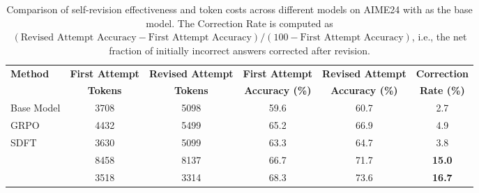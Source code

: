 \begin{table}[H]
\centering
\setlength{\tabcolsep}{3pt}
\small
\begin{tabular}{lccccc}
\toprule
\multirow{2}{*}{\textbf{Method}} & \textbf{First Attempt} & \textbf{Revised Attempt} & \textbf{First Attempt } & \textbf{Revised Attempt} & \textbf{Correction} \\
 & \textbf{Tokens} & \textbf{Tokens} & \textbf{Accuracy (\%)} & \textbf{Accuracy (\%)} & \textbf{Rate (\%)} \\
\midrule
Base Model & 3708 & 5098 & 59.6 & 60.7 & 2.7 \\
GRPO & 4432 & 5499 & 65.2 & 66.9 & 4.9 \\
SDFT & 3630 & 5099 & 63.3 & 64.7 & 3.8 \\
\sft{}  & 8458 & 8137 & 66.7 & 71.7 & \textbf{15.0} \\
\ours{} & 3518 & 3314 & 68.3 & 73.6 & \textbf{16.7} \\
\bottomrule
\end{tabular}
\caption{Comparison of self-revision effectiveness and token costs across different models on AIME24 with \qwen{} as the base model. The Correction Rate is computed as $(\text{Revised Attempt Accuracy} - \text{First Attempt Accuracy}) / (100 - \text{First Attempt Accuracy})$, i.e., the net fraction of initially incorrect answers corrected after revision.}
\label{tab:revision-token-tradeoff}
\end{table}